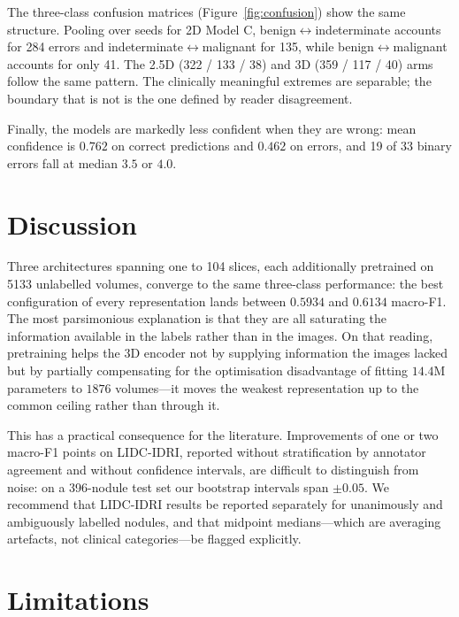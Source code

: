 \documentclass[11pt]{article}
\begin{document}
The three-class confusion matrices (Figure~\ref{fig:confusion}) show the same
structure. Pooling over seeds for 2D Model C,
benign$\leftrightarrow$indeterminate accounts for 284 errors and
indeterminate$\leftrightarrow$malignant for 135, while
benign$\leftrightarrow$malignant accounts for only 41. The 2.5D (322 / 133 / 38)
and 3D (359 / 117 / 40) arms follow the same pattern. The clinically meaningful
extremes are separable; the boundary that is not is the one defined by reader
disagreement.

Finally, the models are markedly less confident when they are wrong: mean
confidence is $0.762$ on correct predictions and $0.462$ on errors, and 19 of
33 binary errors fall at median $3.5$ or $4.0$.

\section{Discussion}

Three architectures spanning one to 104 slices, each additionally pretrained on
5133 unlabelled volumes, converge to the same three-class performance: the best
configuration of every representation lands between $0.5934$ and $0.6134$
macro-F1. The most parsimonious explanation is that they are all saturating the
information available in the labels rather than in the images. On that reading,
pretraining helps the 3D encoder not by supplying information the images lacked
but by partially compensating for the optimisation disadvantage of fitting
$14.4$M parameters to $1876$ volumes---it moves the weakest representation up
to the common ceiling rather than through it.

This has a practical consequence for the literature. Improvements of one or two
macro-F1 points on LIDC-IDRI, reported without stratification by annotator
agreement and without confidence intervals, are difficult to distinguish from
noise: on a 396-nodule test set our bootstrap intervals span $\pm0.05$. We
recommend that LIDC-IDRI results be reported separately for unanimously and
ambiguously labelled nodules, and that midpoint medians---which are averaging
artefacts, not clinical categories---be flagged explicitly.

\section{Limitations}
\end{document}
